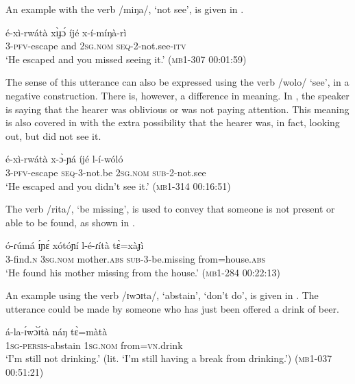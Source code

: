 \documentclass[output=paper,colorlinks,citecolor=brown,draftmode]{langscibook}
\begin{document}
An example with the verb /miŋa/, ‘not see’, is given in . 

\ea\label{ex:lop:63}
        \gll é-xì-rwátà  xɪ̀ɟɔ́  íjé x-í-míŋà-rì \\ 
             3-\textsc{pfv}{}-escape and 2\textsc{sg.nom}  \textsc{seq}{}-2-not.see-\textsc{itv} \\
        \glt ‘He escaped and you missed seeing it.’   (\textsc{mb1-307} \textsc{00:}01:59)
\z

The sense of this utterance can also be expressed using the verb /wolo/ ‘see’, in a negative construction. There is, however, a difference in meaning. In , the speaker is saying that the hearer was oblivious or was not paying attention. This meaning is also covered in  with the extra possibility that the hearer was, in fact, looking out, but did not see it.

\ea\label{ex:lop:64}
        \gll é-xì-rwátà  x-ɔ̀-ɲá  íjé l-í-wóló \\ 
             3-\textsc{pfv}{}-escape \textsc{seq}{}-3-not.be 2\textsc{sg.nom}  \textsc{sub}{}-2-not.see \\
        \glt ‘He escaped and you didn’t see it.’ (\textsc{mb1-314} \textsc{00}:16:51)
\z

The verb /rita/, ‘be missing’, is used to convey that someone is not present or able to be found, as shown in . 

\ea\label{ex:lop:65}
        \gll ó-ɾúmá ɪ́ɲɛ́ xótóɲí l-é-ɾítà tɛ̀=xàɟì  \\ 
             3-find.\textsc{n} 3\textsc{sg.nom} mother.\textsc{abs} \textsc{sub}{}-3-be.missing from=house.\textsc{abs} \\
        \glt ‘He found his mother missing from the house.’   (\textsc{mb1-284} \textsc{00}:22:13)
\z

An example using the verb /ɪwɔɪta/, ‘abstain’, ‘don’t do’, is given in . The utterance could be made by someone who has just been offered a drink of beer. 

\ea\label{ex:lop:66}
        \gll á-la-ɪ́wɔ̀ɪ́tà náŋ tɛ̀=màtà    \\ 
              1\textsc{sg-persis-}abstain 1\textsc{sg.nom} from=\textsc{vn}.drink \\
        \glt ‘I’m still not drinking.’ (lit. ‘I’m still having a break from drinking.’) (\textsc{mb1-037} \textsc{00:51:21})
\z
\end{document}
